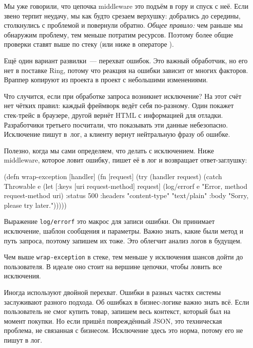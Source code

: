 Мы уже говорили, что цепочка middleware это подъём в гору и спуск с
неё. Если звено терпит неудачу, мы как будто срезаем верхушку: добрались до
середины, столкнулись с проблемой и повернули обратно. \emph{Общее правило:} чем
раньше мы обнаружим проблему, тем меньше потратим ресурсов. Поэтому более общие
проверки ставят выше по стеку (или ниже в операторе \arr).


Ещё один вариант развилки~--- перехват ошибок. Это важный обработчик, но его
нет в поставке Ring, потому что реакция на ошибки зависит от многих
факторов. Враппер копируют из проекта в проект с небольшими изменениями.

Что случится, если при обработке запроса возникнет исключение? На этот счёт
нет чётких правил: каждый фреймворк ведёт себя по-разному. Один покажет
стек-трейс в браузере, другой вернёт HTML с информацией для
отладки. Разработчики третьего посчитали, что показывать эти данные
небезопасно. Исключение пишут в~лог, а клиенту вернут нейтральную фразу об
ошибке.

Полезно, когда мы сами определяем, что делать с исключением. Ниже middleware,
которое ловит ошибку, пишет её в лог и возвращает ответ-заглушку:


\begin{english}
  \begin{clojure}
(defn wrap-exception [handler]
  (fn [request]
    (try
      (handler request)
      (catch Throwable e
        (let [{:keys [uri request-method]} request]
          (log/errorf e "Error, method %
                      request-method uri)
          {:status 500
           :headers {"content-type" "text/plain"}
           :body "Sorry, please try later."})))))
  \end{clojure}
\end{english}


Выражение \verb|log/errorf| это макрос для записи ошибки. Он принимает
исключение, шаблон сообщения и параметры. Важно знать, какие были метод и путь
запроса, поэтому запишем их тоже. Это облегчит анализ логов в будущем.

Чем выше \verb|wrap-exception| в стеке, тем меньше у исключения шансов дойти
до пользователя. В идеале оно стоит на вершине цепочки, чтобы ловить все
исключения.

Иногда используют двойной перехват. Ошибки в разных частях системы заслуживают
разного подхода. Об ошибках в бизнес-логике важно знать всё. Если
пользователь не смог купить товар, запишем весь контекст, который был на момент
покупки. Но если пришёл повреждённый JSON, это техническая проблема, не
связанная с бизнесом. Исключение здесь это норма, потому его не пишут в лог.


